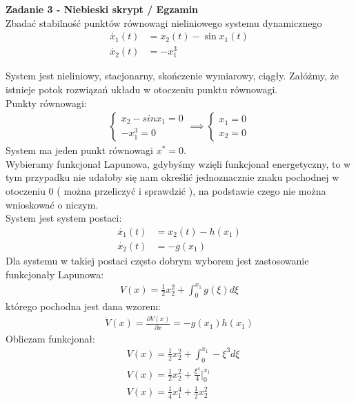 \documentclass[a4paper,11pt]{article}
\begin{document}
\newpage
\begin{framed}
\textbf{Zadanie 3 - Niebieski skrypt / Egzamin } \\ 
Zbadać stabilność punktów równowagi nieliniowego systemu dynamicznego
\begin{align*}
\dot{x_{1}}(t)&=x_{2}(t) - \sin x_{1}(t) \\
\dot{x_{2}}(t)&=-x_{1}^{3}
\end{align*}
\end{framed}
System jest nieliniowy, stacjonarny, skończenie wymiarowy, ciągły. Załóżmy, że istnieje potok rozwiązań układu w otoczeniu punktu równowagi. \\
Punkty równowagi:
\begin{align*}
\begin{cases}
x_{2} - sinx_{1} = 0 \\
-x_{1}^{3} = 0
\end{cases}
\implies
\begin{cases}
x_{1}=0 \\
x_{2} = 0
\end{cases}
\end{align*}
System ma jeden punkt równowagi \(x^{*}=0\). \\
Wybieramy funkcjonał Lapunowa, gdybyśmy wzięli funkcjonał energetyczny, to w tym przypadku nie udałoby się nam określić jednoznacznie znaku pochodnej w otoczeniu 0 ( można przeliczyć i sprawdzić ), na podstawie czego nie można wnioskować o niczym. \\
System jest system postaci:
\begin{align*}
\dot{x_{1}}(t)&=x_{2}(t) - h(x_{1}) \\
\dot{x_{2}}(t)&=-g(x_{1})
\end{align*}
Dla systemu w takiej postaci często dobrym wyborem jest zastosowanie funkcjonały Lapunowa:
\begin{align*}
V(x)=\frac{1}{2}x_{2}^{2}+\int_{0}^{x_{1}}g(\xi ) d\xi
\end{align*}
którego pochodna jest dana wzorem:
\begin{align*}
\dot{V}(x)=\frac{\partial V(x)}{\partial x} = - g(x_{1})h(x_{1})
\end{align*}
Obliczam funkcjonał:
\begin{align*}
&V(x)=\frac{1}{2}x_{2}^{2}+\int_{0}^{x_{1}}-\xi ^{3} d\xi \\
&V(x)=\frac{1}{2}x_{2}^{2}+\frac{\xi ^{4}}{4}\Bigr|_{0}^{x_{1}} \\
&V(x)=\frac{1}{4}x_{1}^{4}+\frac{1}{2}x_{2}^{2}
\end{align*}
\end{document}

